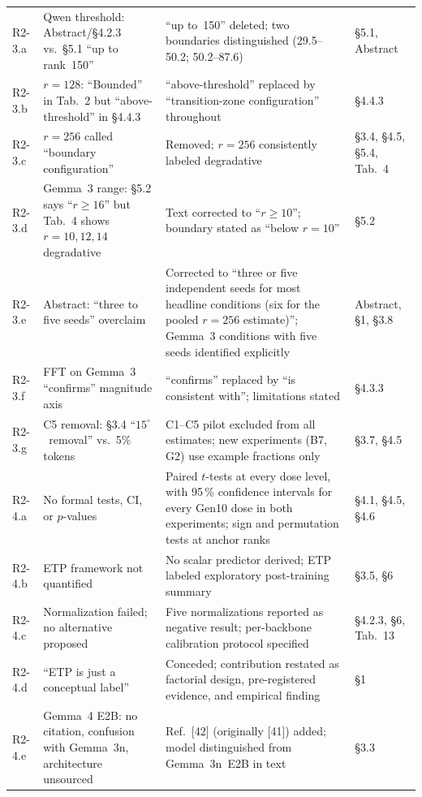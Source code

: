 \documentclass[11pt,a4paper]{article}
\begin{document}
\begin{longtable}{@{}L{1.4cm}L{5.0cm}L{5.5cm}L{3.2cm}@{}}
\addlinespace[2pt]
R2-3.a & Qwen threshold: Abstract/\S4.2.3 vs.\ \S5.1 ``up to rank~150'' & ``up to~150'' deleted; two boundaries distinguished (29.5--50.2; 50.2--87.6) & \S5.1, Abstract \\
R2-3.b & $r=128$: ``Bounded'' in Tab.~2 but ``above-threshold'' in \S4.4.3 & ``above-threshold'' replaced by ``transition-zone configuration'' throughout & \S4.4.3 \\
R2-3.c & $r=256$ called ``boundary configuration'' & Removed; $r=256$ consistently labeled degradative & \S3.4, \S4.5, \S5.4, Tab.~4 \\
R2-3.d & Gemma~3 range: \S5.2 says ``$r{\geq}16$'' but Tab.~4 shows $r{=}10,12,14$ degradative & Text corrected to ``$r \geq 10$''; boundary stated as ``below $r=10$'' & \S5.2 \\
R2-3.e & Abstract: ``three to five seeds'' overclaim & Corrected to ``three or five independent seeds for most headline conditions (six for the pooled $r{=}256$ estimate)''; Gemma~3 conditions with five seeds identified explicitly & Abstract, \S1, \S3.8 \\
R2-3.f & FFT on Gemma~3 ``confirms'' magnitude axis & ``confirms'' replaced by ``is consistent with''; limitations stated & \S4.3.3 \\
R2-3.g & C5 removal: \S3.4 ``$15^{\circ}$~removal'' vs.\ 5\% tokens & C1--C5 pilot excluded from all estimates; new experiments (B7, G2) use example fractions only & \S3.7, \S4.5 \\
\addlinespace[2pt]
R2-4.a & No formal tests, CI, or $p$-values & Paired $t$-tests at every dose level, with 95\,\% confidence intervals for every Gen10 dose in both experiments; sign and permutation tests at anchor ranks & \S4.1, \S4.5, \S4.6 \\
R2-4.b & ETP framework not quantified & No scalar predictor derived; ETP labeled exploratory post-training summary & \S3.5, \S6 \\
R2-4.c & Normalization failed; no alternative proposed & Five normalizations reported as negative result; per-backbone calibration protocol specified & \S4.2.3, \S6, Tab.~13 \\
R2-4.d & ``ETP is just a conceptual label'' & Conceded; contribution restated as factorial design, pre-registered evidence, and empirical finding & \S1 \\
R2-4.e & Gemma~4 E2B: no citation, confusion with Gemma~3n, architecture unsourced & Ref.~[42] (originally [41]) added; model distinguished from Gemma~3n~E2B in text & \S3.3 \\

\end{longtable}
\end{document}
